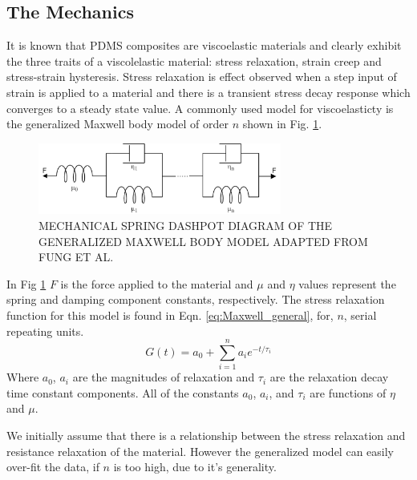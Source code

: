 \subsection*{The Mechanics}
It is known that PDMS composites are viscoelastic materials and clearly exhibit the three traits of a viscolelastic material\cite{Fung1993}: stress relaxation, strain creep and stress-strain hysteresis. Stress relaxation is effect observed when a step input of strain is applied to a material and there is a transient stress decay response which converges to a steady state value. A commonly used model for viscoelasticty is the generalized Maxwell body model of order $n$ shown in Fig. \ref{fig:Maxwell_general}.
\begin{figure}[H]
	\centering
	\includegraphics[width=8cm]{Figures/Generlised_Maxwell_body.png}
	\caption{MECHANICAL SPRING DASHPOT DIAGRAM OF THE GENERALIZED MAXWELL BODY MODEL ADAPTED FROM FUNG ET AL.\cite{Fung1993}}
	\label{fig:Maxwell_general}
\end{figure}
In Fig \ref{fig:Maxwell_general} $F$ is the force applied to the material and $\mu$ and $\eta$ values represent the spring and damping component constants, respectively. The stress relaxation function for this model is found in Eqn. \ref{eq:Maxwell_general}, for, $n$, serial repeating units. 
\begin{equation}
	G(t) = a_0 + \sum^n_{i=1} a_i e^{-t/\tau_i}
	\label{eq:Maxwell_general} 
\end{equation}
Where $a_0$, $a_i$ are the magnitudes of relaxation and $\tau_i$ are the relaxation decay time constant components. All of the constants $a_0$, $a_i$, and $\tau_i$ are functions of $\eta$ and $\mu$. 



We initially assume that there is a relationship between the stress relaxation and resistance relaxation of the material. However the generalized model can easily over-fit the data, if $n$ is too high, due to it's generality.



